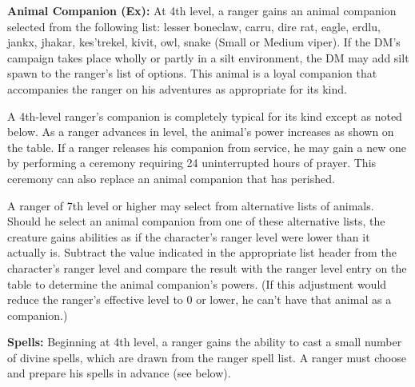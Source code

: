 \textbf{Animal Companion (Ex):} At 4th level, a ranger gains an animal companion selected from the following list: lesser boneclaw, carru, dire rat, eagle, erdlu, jankx, jhakar, kes'trekel, kivit, owl, snake (Small or Medium viper). If the DM's campaign takes place wholly or partly in a silt environment, the DM may add silt spawn to the ranger's list of options. This animal is a loyal companion that accompanies the ranger on his adventures as appropriate for its kind. 

A 4th-level ranger's companion is completely typical for its kind except as noted below. As a ranger advances in level, the animal's power increases as shown on the table. If a ranger releases his companion from service, he may gain a new one by performing a ceremony requiring 24 uninterrupted hours of prayer. This ceremony can also replace an animal companion that has perished.

A ranger of 7th level or higher may select from alternative lists of animals. Should he select an animal companion from one of these alternative lists, the creature gains abilities as if the character's ranger level were lower than it actually is. Subtract the value indicated in the appropriate list header from the character's ranger level and compare the result with the ranger level entry on the table to determine the animal companion's powers. (If this adjustment would reduce the ranger's effective level to 0 or lower, he can't have that animal as a companion.)



\textbf{Spells:} Beginning at 4th level, a ranger gains the ability to cast a small number of divine spells, which are drawn from the ranger spell list. A ranger must choose and prepare his spells in advance (see below).

